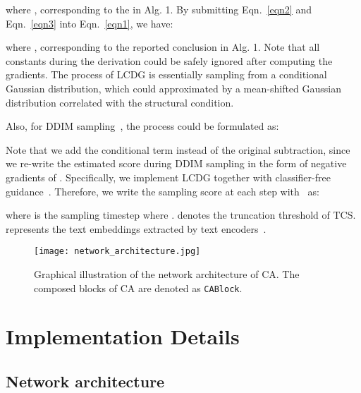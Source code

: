 \documentclass{article}
\begin{document}
where , corresponding to the  in Alg. 1. By submitting Eqn.~\ref{eqn2} and Eqn.~\ref{eqn3} into Eqn.~\ref{eqn1}, we have:

where , corresponding to the reported conclusion in Alg. 1. Note that all constants during the derivation could be safely ignored after computing the gradients. The process of LCDG is essentially sampling from a conditional Gaussian distribution, which could approximated by a mean-shifted Gaussian distribution correlated with the structural condition. 

Also, for DDIM sampling~\cite{ho2020denoising}, the process could be formulated as:

Note that we add the conditional term instead of the original subtraction, since we re-write the estimated score during DDIM sampling in the form of negative gradients of . Specifically, we implement LCDG together with classifier-free guidance~\cite{ho2022classifier}. Therefore, we write the sampling score at each step with~\cite{ho2022classifier} as:

where  is the sampling timestep where .  denotes the truncation threshold of TCS.  represents the text embeddings extracted by text encoders~\cite{radford2021learning,cherti2022reproducible}.











\begin{figure*}[t!]
  \centering
  \texttt{[image: network\_architecture.jpg]} \caption{Graphical illustration of the network architecture of CA. The composed blocks of CA are denoted as \texttt{CABlock}.}
  \label{figure:network architecture}
  \end{figure*}

\section{Implementation Details}
\label{section:implementation details}
\subsection{Network architecture}
\end{document}
